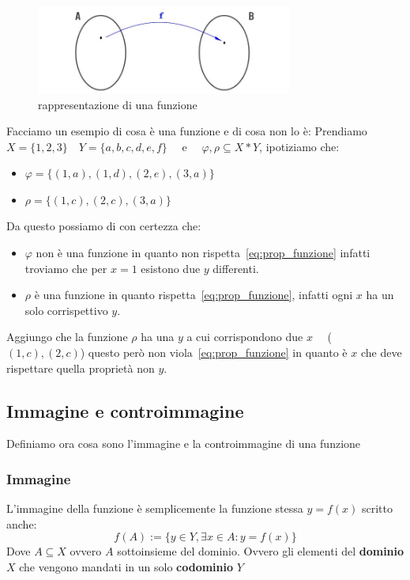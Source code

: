 \documentclass{article}
\begin{document}
\begin{figure}[h]
        \centering
                \includegraphics[width=0.75\textwidth]{esempio_funzione.jpg}
        \caption{rappresentazione di una funzione}\label{fig:esempio_funzione}
\end{figure}
Facciamo un esempio di cosa è una funzione e di cosa non lo è: \newline
Prendiamo $ X = \{1,2,3\} \quad  Y = \{a,b,c,d,e,f\} \quad $  e $\quad  \varphi, \rho \subseteq X*Y$, ipotiziamo che:
\begin{itemize}
        \item $ \varphi = \{(1,a), (1,d), (2,e), (3,a)\} $ 
        \item $ \rho = \{(1,c), (2,c), (3,a)\} $ 
\end{itemize}

Da questo possiamo di con certezza che:
\begin{itemize}
        \item $ \varphi$ non è una funzione in quanto non rispetta~\ref{eq:prop_funzione} infatti troviamo che per $ x = 1 $ esistono due $ y $ differenti. 
        \item $ \rho $ è una funzione in quanto rispetta~\ref{eq:prop_funzione}, infatti ogni $ x $ ha un solo corrispettivo $ y $.     
\end{itemize}

Aggiungo che la funzione $ \rho $ ha una $ y $ a cui corrispondono due $ x \quad $ ($ (1,c), (2,c) $) questo però non viola~\ref{eq:prop_funzione} in quanto è $ x $ che deve rispettare quella proprietà non $ y $.  


\subsection{Immagine e controimmagine}
Definiamo ora cosa sono l'immagine e la controimmagine di una funzione

\subsubsection{Immagine}
L'immagine della funzione è semplicemente la funzione stessa $ y = f(x) $ scritto anche:
\begin{equation*}
        f(A) := \{y \in Y, \exists x \in A : y = f(x) \}
\end{equation*}
Dove $ A \subseteq X $ ovvero $ A $ sottoinsieme del dominio. \newline  
Ovvero gli elementi del \textbf{dominio} $ X $ che vengono mandati in un solo \textbf{codominio} $ Y $ 
\end{document}
